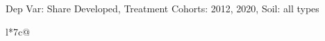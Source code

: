 \begin{table}[H]
\captionlistentry[table]{}
\label{table:beaver_land_class_DVis_land_class_3_SCg13_SSall_soil}
\scriptsize %
Dep Var: Share Developed, Treatment Cohorts: 2012, 2020, Soil: all types \\
\begin{threeparttable}
\begin{tabulary}{\textwidth}{l*{7}{c}@{}}
\toprule \toprule
\noalign{\smallskip}
\noalign{\smallskip}
\midrule \bottomrule
\end{tabulary}
\medskip
\end{threeparttable}
\end{table}
